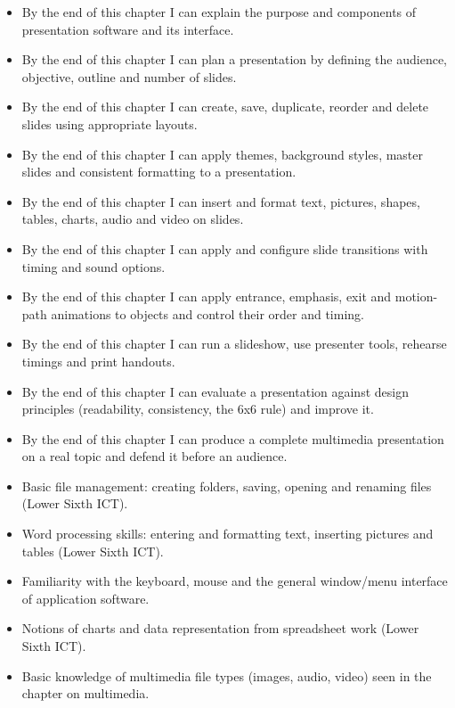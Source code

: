 \documentclass[11pt]{article}
\begin{document}
\begin{objectifs}
\begin{itemize}
\item By the end of this chapter I can explain the purpose and components of presentation software and its interface.
\item By the end of this chapter I can plan a presentation by defining the audience, objective, outline and number of slides.
\item By the end of this chapter I can create, save, duplicate, reorder and delete slides using appropriate layouts.
\item By the end of this chapter I can apply themes, background styles, master slides and consistent formatting to a presentation.
\item By the end of this chapter I can insert and format text, pictures, shapes, tables, charts, audio and video on slides.
\item By the end of this chapter I can apply and configure slide transitions with timing and sound options.
\item By the end of this chapter I can apply entrance, emphasis, exit and motion-path animations to objects and control their order and timing.
\item By the end of this chapter I can run a slideshow, use presenter tools, rehearse timings and print handouts.
\item By the end of this chapter I can evaluate a presentation against design principles (readability, consistency, the 6x6 rule) and improve it.
\item By the end of this chapter I can produce a complete multimedia presentation on a real topic and defend it before an audience.
\end{itemize}
\end{objectifs}

\begin{prerequis}
\begin{itemize}
\item Basic file management: creating folders, saving, opening and renaming files (Lower Sixth ICT).
\item Word processing skills: entering and formatting text, inserting pictures and tables (Lower Sixth ICT).
\item Familiarity with the keyboard, mouse and the general window/menu interface of application software.
\item Notions of charts and data representation from spreadsheet work (Lower Sixth ICT).
\item Basic knowledge of multimedia file types (images, audio, video) seen in the chapter on multimedia.
\end{itemize}
\end{prerequis}
\end{document}
